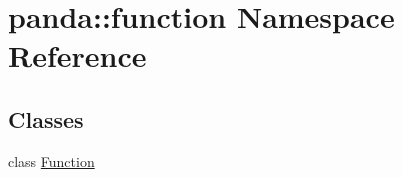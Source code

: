 \hypertarget{namespacepanda_1_1function}{
\section{panda::function Namespace Reference}
\label{namespacepanda_1_1function}
}
\subsection*{Classes}
\begin{DoxyCompactItemize}
\item 
class \hyperlink{classpanda_1_1function_1_1Function}{Function}
\end{DoxyCompactItemize}
